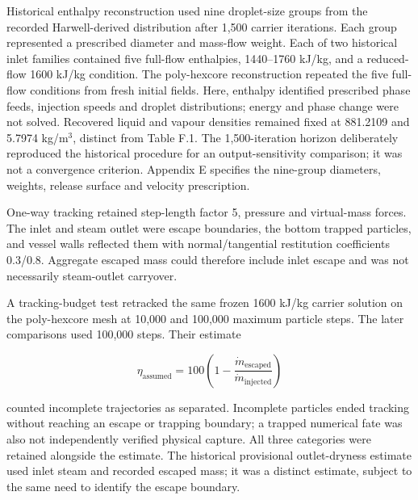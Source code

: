 Historical enthalpy reconstruction used nine droplet-size groups from the recorded Harwell-derived distribution after 1,500 carrier iterations. Each group represented a prescribed diameter and mass-flow weight. Each of two historical inlet families contained five full-flow enthalpies, 1440--1760 kJ/kg, and a reduced-flow 1600 kJ/kg condition. The poly-hexcore reconstruction repeated the five full-flow conditions from fresh initial fields. Here, enthalpy identified prescribed phase feeds, injection speeds and droplet distributions; energy and phase change were not solved. Recovered liquid and vapour densities remained fixed at 881.2109 and 5.7974 kg/m\(^{3}\), distinct from Table F.1. The 1,500-iteration horizon deliberately reproduced the historical procedure for an output-sensitivity comparison; it was not a convergence criterion. Appendix E specifies the nine-group diameters, weights, release surface and velocity prescription.

One-way tracking retained step-length factor 5, pressure and virtual-mass forces. The inlet and steam outlet were escape boundaries, the bottom trapped particles, and vessel walls reflected them with normal/tangential restitution coefficients 0.3/0.8. Aggregate escaped mass could therefore include inlet escape and was not necessarily steam-outlet carryover.

A tracking-budget test retracked the same frozen 1600 kJ/kg carrier solution on the poly-hexcore mesh at 10,000 and 100,000 maximum particle steps. The later comparisons used 100,000 steps. Their estimate

\[\eta_{\mathrm{assumed}}=100\left(1-\frac{\dot m_{\mathrm{escaped}}}{\dot m_{\mathrm{injected}}}\right)\]

counted incomplete trajectories as separated. Incomplete particles ended tracking without reaching an escape or trapping boundary; a trapped numerical fate was also not independently verified physical capture. All three categories were retained alongside the estimate. The historical provisional outlet-dryness estimate used inlet steam and recorded escaped mass; it was a distinct estimate, subject to the same need to identify the escape boundary.
